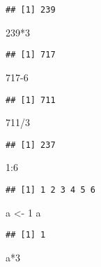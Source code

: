 \documentclass[
]{article}
\newenvironment{Shaded}{\begin{snugshade}}{\end{snugshade}}
\newcommand{\DecValTok}[1]{\textcolor[rgb]{0.00,0.00,0.81}{#1}}
\newcommand{\NormalTok}[1]{#1}
\newcommand{\OtherTok}[1]{\textcolor[rgb]{0.56,0.35,0.01}{#1}}
\newcommand{\SpecialCharTok}[1]{\textcolor[rgb]{0.00,0.00,0.00}{#1}}
\begin{document}
\begin{verbatim}
## [1] 239
\end{verbatim}

\begin{Shaded}
\begin{Highlighting}[]
\DecValTok{239}\SpecialCharTok{*}\DecValTok{3}
\end{Highlighting}
\end{Shaded}

\begin{verbatim}
## [1] 717
\end{verbatim}

\begin{Shaded}
\begin{Highlighting}[]
\DecValTok{717{-}6}
\end{Highlighting}
\end{Shaded}

\begin{verbatim}
## [1] 711
\end{verbatim}

\begin{Shaded}
\begin{Highlighting}[]
\DecValTok{711}\SpecialCharTok{/}\DecValTok{3}
\end{Highlighting}
\end{Shaded}

\begin{verbatim}
## [1] 237
\end{verbatim}

\begin{Shaded}
\begin{Highlighting}[]
\DecValTok{1}\SpecialCharTok{:}\DecValTok{6}
\end{Highlighting}
\end{Shaded}

\begin{verbatim}
## [1] 1 2 3 4 5 6
\end{verbatim}

\begin{Shaded}
\begin{Highlighting}[]
\NormalTok{a }\OtherTok{\textless{}{-}} \DecValTok{1}
\NormalTok{a}
\end{Highlighting}
\end{Shaded}

\begin{verbatim}
## [1] 1
\end{verbatim}

\begin{Shaded}
\begin{Highlighting}[]
\NormalTok{a}\SpecialCharTok{*}\DecValTok{3}
\end{Highlighting}
\end{Shaded}
\end{document}
